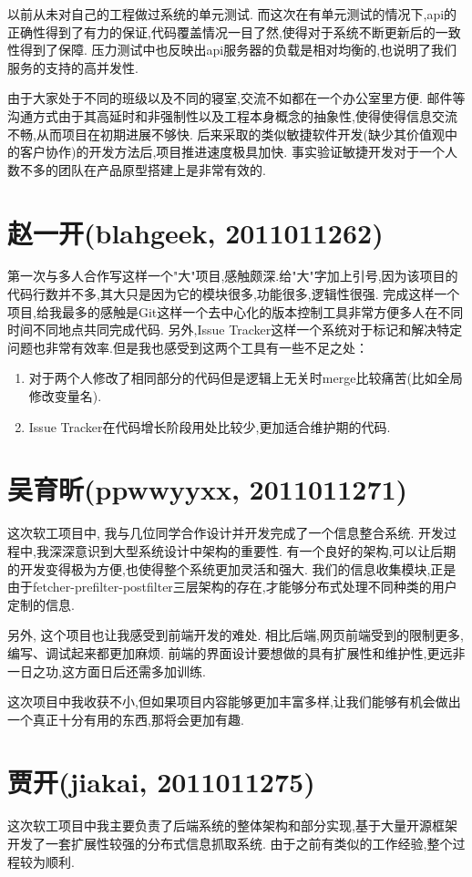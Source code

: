   以前从未对自己的工程做过系统的单元测试.
  而这次在有单元测试的情况下,api的正确性得到了有力的保证,代码覆盖情况一目了然,使得对于系统不断更新后的一致性得到了保障.
  压力测试中也反映出api服务器的负载是相对均衡的,也说明了我们服务的支持的高并发性.

  由于大家处于不同的班级以及不同的寝室,交流不如都在一个办公室里方便.
  邮件等沟通方式由于其高延时和非强制性以及工程本身概念的抽象性,使得使得信息交流不畅,从而项目在初期进展不够快.
  后来采取的类似敏捷软件开发(缺少其价值观中的客户协作)的开发方法后,项目推进速度极具加快.
  事实验证敏捷开发对于一个人数不多的团队在产品原型搭建上是非常有效的.

\section{赵一开(blahgeek, 2011011262)}
  第一次与多人合作写这样一个"大"项目,感触颇深.给"大"字加上引号,因为该项目的代码行数并不多,其大只是因为它的模块很多,功能很多,逻辑性很强.
  完成这样一个项目,给我最多的感触是Git这样一个去中心化的版本控制工具非常方便多人在不同时间不同地点共同完成代码.
  另外,Issue Tracker这样一个系统对于标记和解决特定问题也非常有效率.但是我也感受到这两个工具有一些不足之处：

  \begin{enumerate}
    \item 对于两个人修改了相同部分的代码但是逻辑上无关时merge比较痛苦(比如全局修改变量名).
    \item Issue Tracker在代码增长阶段用处比较少,更加适合维护期的代码.
  \end{enumerate}

\section{吴育昕(ppwwyyxx, 2011011271)}
  这次软工项目中, 我与几位同学合作设计并开发完成了一个信息整合系统.
  开发过程中,我深深意识到大型系统设计中架构的重要性.
  有一个良好的架构,可以让后期的开发变得极为方便,也使得整个系统更加灵活和强大.
  我们的信息收集模块,正是由于fetcher-prefilter-postfilter三层架构的存在,才能够分布式处理不同种类的用户定制的信息.

  另外, 这个项目也让我感受到前端开发的难处.
  相比后端,网页前端受到的限制更多,编写、调试起来都更加麻烦.
  前端的界面设计要想做的具有扩展性和维护性,更远非一日之功,这方面日后还需多加训练.

  这次项目中我收获不小,但如果项目内容能够更加丰富多样,让我们能够有机会做出一个真正十分有用的东西,那将会更加有趣.

\section{贾开(jiakai, 2011011275)}
  这次软工项目中我主要负责了后端系统的整体架构和部分实现,基于大量开源框架开发了一套扩展性较强的分布式信息抓取系统.
  由于之前有类似的工作经验,整个过程较为顺利.

